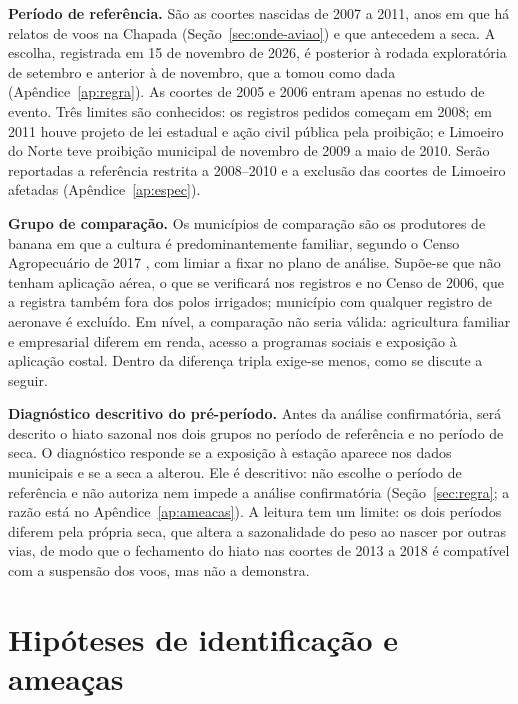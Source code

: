 \textbf{Período de referência.} São as coortes nascidas de 2007 a 2011, anos
em que há relatos de voos na Chapada (Seção~\ref{sec:onde-aviao}) e que
antecedem a seca. A escolha, registrada em 15 de novembro de 2026, é posterior
à rodada exploratória de setembro e anterior à de novembro, que a tomou como
dada (Apêndice~\ref{ap:regra}). As coortes de 2005 e 2006 entram apenas no
estudo de evento. Três limites são conhecidos: os registros pedidos começam em
2008; em 2011 houve projeto de lei estadual e ação civil pública pela
proibição; e Limoeiro do Norte teve proibição municipal de novembro de 2009 a
maio de 2010. Serão reportadas a referência restrita a 2008--2010 e a exclusão
das coortes de Limoeiro afetadas (Apêndice~\ref{ap:espec}).

\textbf{Grupo de comparação.} Os municípios de comparação são os produtores de
banana em que a cultura é predominantemente familiar, segundo o Censo
Agropecuário de 2017 \cite{ibge2017censoagro}, com limiar a fixar no plano de
análise. Supõe-se que não tenham aplicação aérea, o que se verificará nos
registros e no Censo de 2006, que a registra também fora dos polos irrigados;
município com qualquer registro de aeronave é excluído. Em nível, a comparação
não seria válida: agricultura familiar e empresarial diferem em renda, acesso
a programas sociais e exposição à aplicação costal. Dentro da diferença tripla
exige-se menos, como se discute a seguir.

\textbf{Diagnóstico descritivo do pré-período.}\label{sec:diagnostico} Antes
da análise confirmatória, será descrito o hiato sazonal nos dois grupos no
período de referência e no período de seca. O diagnóstico responde se a
exposição à estação aparece nos dados municipais e se a seca a alterou. Ele é
descritivo: não escolhe o período de referência e não autoriza nem impede a
análise confirmatória (Seção~\ref{sec:regra}; a razão está no
Apêndice~\ref{ap:ameacas}). A leitura tem um limite: os dois períodos diferem
pela própria seca, que altera a sazonalidade do peso ao nascer por outras
vias, de modo que o fechamento do hiato nas coortes de 2013 a 2018 é
compatível com a suspensão dos voos, mas não a demonstra.

\section{Hipóteses de identificação e ameaças}
\label{cap:ameacas}

